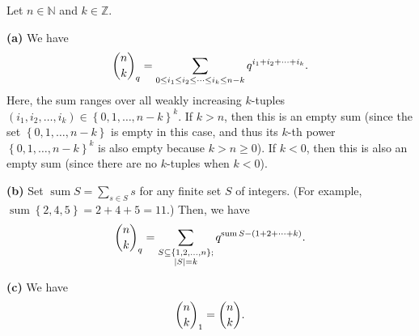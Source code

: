 \begin{proposition}
\label{prop.pars.qbinom.alt-defs}Let $n\in\mathbb{N}$ and $k\in\mathbb{Z}$.
\medskip

\textbf{(a)} We have%
\[
\dbinom{n}{k}_{q}=\sum_{0\leq i_{1}\leq i_{2}\leq\cdots\leq i_{k}\leq
n-k}q^{i_{1}+i_{2}+\cdots+i_{k}}.
\]
Here, the sum ranges over all weakly increasing $k$-tuples $\left(
i_{1},i_{2},\ldots,i_{k}\right)  \in\left\{  0,1,\ldots,n-k\right\}  ^{k}$. If
$k>n$, then this is an empty sum (since the set $\left\{  0,1,\ldots
,n-k\right\}  $ is empty in this case, and thus its $k$-th power $\left\{
0,1,\ldots,n-k\right\}  ^{k}$ is also empty because $k>n\geq0$). If $k<0$,
then this is also an empty sum (since there are no $k$-tuples when $k<0$).
\medskip

\textbf{(b)} Set $\operatorname*{sum}S=\sum_{s\in S}s$ for any finite set $S$
of integers. (For example, $\operatorname*{sum}\left\{  2,4,5\right\}
=2+4+5=11$.) Then, we have%
\[
\dbinom{n}{k}_{q}=\sum_{\substack{S\subseteq\left\{  1,2,\ldots,n\right\}
;\\\left\vert S\right\vert =k}}q^{\operatorname*{sum}S-\left(  1+2+\cdots
+k\right)  }.
\]


\textbf{(c)} We have%
\[
\dbinom{n}{k}_{1}=\dbinom{n}{k}.
\]

\end{proposition}

